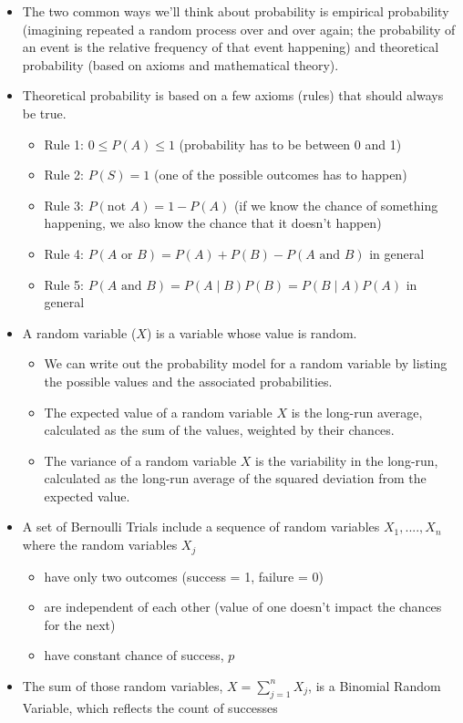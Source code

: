 \documentclass[]{book}
\providecommand{\tightlist}{%
  \setlength{\itemsep}{0pt}\setlength{\parskip}{0pt}}
\begin{document}
\begin{itemize}
\item
  The two common ways we'll think about probability is empirical probability (imagining repeated a random process over and over again; the probability of an event is the relative frequency of that event happening) and theoretical probability (based on axioms and mathematical theory).
\item
  Theoretical probability is based on a few axioms (rules) that should always be true.

  \begin{itemize}
  \tightlist
  \item
    Rule 1: \(0\leq P(A)\leq 1\) (probability has to be between 0 and 1)
  \item
    Rule 2: \(P(S) = 1\) (one of the possible outcomes has to happen)
  \item
    Rule 3: \(P(\text{not }A) = 1 - P(A)\) (if we know the chance of something happening, we also know the chance that it doesn't happen)
  \item
    Rule 4: \(P(A\text{ or }B) = P(A) + P(B) - P(A\text{ and } B)\) in general
  \item
    Rule 5: \(P(A\text{ and }B) = P(A \mid B)P(B) = P(B \mid A)P(A)\) in general
  \end{itemize}
\item
  A random variable (\(X\)) is a variable whose value is random.

  \begin{itemize}
  \tightlist
  \item
    We can write out the probability model for a random variable by listing the possible values and the associated probabilities.
  \item
    The expected value of a random variable \(X\) is the long-run average, calculated as the sum of the values, weighted by their chances.
  \item
    The variance of a random variable \(X\) is the variability in the long-run, calculated as the long-run average of the squared deviation from the expected value.
  \end{itemize}
\item
  A set of Bernoulli Trials include a sequence of random variables \(X_1,....,X_n\) where the random variables \(X_j\)

  \begin{itemize}
  \tightlist
  \item
    have only two outcomes (success = 1, failure = 0)
  \item
    are independent of each other (value of one doesn't impact the chances for the next)
  \item
    have constant chance of success, \(p\)
  \end{itemize}
\item
  The sum of those random variables, \(X = \sum_{j=1}^n X_j\), is a Binomial Random Variable, which reflects the count of successes


\end{itemize}
\end{document}
